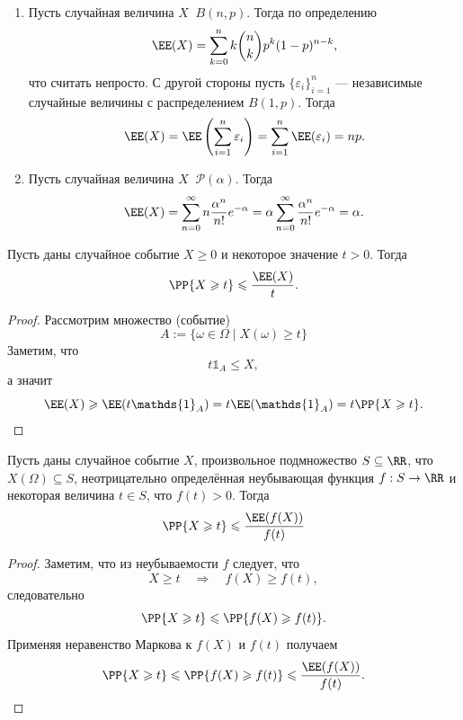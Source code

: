 \documentclass[12pt,a4paper]{article}
\newcommand{\ind}{\ensuremath{\mathds{1}}\xspace}
\newcommand{\Deq}{\mathop{\stackrel{\mathcal{D}}{=}}}
\begin{document}
    \begin{example}\ 
        \begin{enumerate}
            \item Пусть случайная величина $X \Deq B(n, p)$. Тогда по определению
                \[\EE(X) = \sum_{k=0}^n k \binom{n}{k} p^k (1-p)^{n-k},\]
                что считать непросто. С другой стороны пусть $\{\varepsilon_i\}_{i=1}^n$ --- независимые случайные величины с распределением $B(1, p)$. Тогда
                \[\EE(X) = \EE\left(\sum_{i=1}^n \varepsilon_i\right) = \sum_{i=1}^n \EE(\varepsilon_i) = np.\]
            \item Пусть случайная величина $X \Deq \mathcal{P}(\alpha)$. Тогда
                \[\EE(X) = \sum_{n=0}^\infty n \frac{\alpha^n}{n!} e^{-\alpha} = \alpha \sum_{n=0}^\infty \frac{\alpha^n}{n!} e^{-\alpha} = \alpha.\]
        \end{enumerate}
    \end{example}

    \begin{theorem}
        Пусть даны случайное событие $X \geqslant 0$ и некоторое значение $t > 0$. Тогда
        \[\PP\{X \geqslant t\} \leqslant \frac{\EE(X)}{t}.\]
    \end{theorem}

    \begin{proof}
        Рассмотрим множество (событие)
        \[A := \{\omega \in \Omega \mid X(\omega) \geqslant t\}\]
        Заметим, что
        \[t \ind_A \leqslant X,\]
        а значит
        \[\EE(X) \geqslant \EE(t \ind_A) = t \EE(\ind_A) = t \PP\{X \geqslant t\}.\]
    \end{proof}

    \begin{corollary}\label{Markov-inequality-theorem-functional-corollary}
        Пусть даны случайное событие $X$, произвольное подмножество $S \subseteq \RR$, что $X(\Omega) \subseteq S$, неотрицательно определённая неубывающая функция $f: S \to \RR$ и некоторая величина $t \in S$, что $f(t) > 0$. Тогда
        \[\PP\{X \geqslant t\} \leqslant \frac{\EE(f(X))}{f(t)}\]
    \end{corollary}

    \begin{proof}
        Заметим, что из неубываемости $f$ следует, что
        \[X \geqslant t \quad \Longrightarrow \quad f(X) \geqslant f(t),\]
        следовательно
        \[\PP\{X \geqslant t\} \leqslant \PP\{f(X) \geqslant f(t)\}.\]
        Применяя неравенство Маркова к $f(X)$ и $f(t)$ получаем
        \[\PP\{X \geqslant t\} \leqslant \PP\{f(X) \geqslant f(t)\} \leqslant \frac{\EE(f(X))}{f(t)}.\]
    \end{proof}
\end{document}
